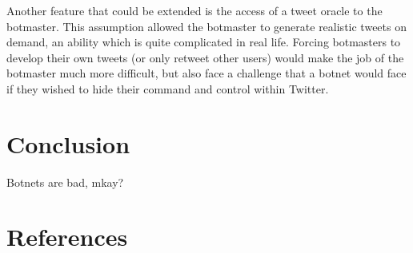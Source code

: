 \documentclass[11pt, oneside]{article} %
\numberwithin{equation}{section} %
\numberwithin{figure}{section} %
\numberwithin{table}{section} %
\begin{document}
		Another feature that could be extended is the access of a tweet oracle to the botmaster. This assumption allowed the botmaster to generate realistic tweets on demand, an ability which is quite complicated in real life. Forcing botmasters to develop their own tweets (or only retweet other users) would make the job of the botmaster much more difficult, but also face a challenge that a botnet would face if they wished to hide their command and control within Twitter.


\section{Conclusion}

        Botnets are bad, mkay?


\clearpage
\section{References}
\end{document}
